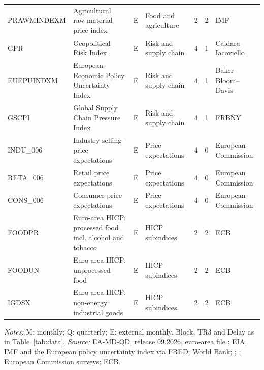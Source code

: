 \begin{longtable}{@{}l>{\raggedright\arraybackslash}p{7.4cm}clrr>{\raggedright\arraybackslash}p{2.6cm}@{}}
PRAWMINDEXM & Agricultural raw-material price index & E & Food and agriculture & 2 & 2 & IMF \\
GPR & Geopolitical Risk Index & E & Risk and supply chain & 4 & 1 & Caldara--Iacoviello \\
EUEPUINDXM & European Economic Policy Uncertainty Index & E & Risk and supply chain & 4 & 1 & Baker--Bloom--Davis \\
GSCPI & Global Supply Chain Pressure Index & E & Risk and supply chain & 4 & 1 & FRBNY \\
INDU\_006 & Industry selling-price expectations & E & Price expectations & 4 & 0 & European Commission \\
RETA\_006 & Retail price expectations & E & Price expectations & 4 & 0 & European Commission \\
CONS\_006 & Consumer price expectations & E & Price expectations & 4 & 0 & European Commission \\
FOODPR & Euro-area HICP: processed food incl. alcohol and tobacco & E & HICP subindices & 2 & 2 & ECB \\
FOODUN & Euro-area HICP: unprocessed food & E & HICP subindices & 2 & 2 & ECB \\
IGDSX & Euro-area HICP: non-energy industrial goods & E & HICP subindices & 2 & 2 & ECB \\
\end{longtable}
\par\footnotesize\textit{Notes:} M: monthly; Q: quarterly; E: external monthly. Block, TR3 and Delay as in Table~\ref{tab:data}. \textit{Source:} EA-MD-QD, release 09.2026, euro-area file \citep{barigozzi2026}; EIA, IMF and the European policy uncertainty index \citep{baker2016} via FRED; World Bank; \citet{caldara2022}; \citet{benigno2022}; European Commission surveys; ECB.\par
